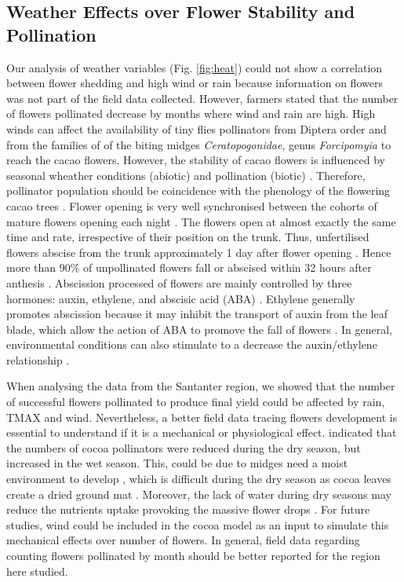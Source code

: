\documentclass[gene,journal,article,submit,moreauthors,pdftex]{Definitions/mdpi}
\begin{document}
\subsection{Weather Effects over Flower Stability and Pollination}

Our analysis of weather variables (Fig. \ref{fig:heat}) could not show a correlation between flower shedding and high wind or rain because information on flowers was not part of the field data collected. However, farmers stated that the number of flowers pollinated decrease by months where wind and rain are high. High winds can affect the availability of tiny flies pollinators from Diptera order and from the families of of the biting midges \textit{Ceratopogonidae},  genus  \textit{Forcipomyia} \citep{Saunders1959, kaufmann1975, sotomayor2020} to reach the cacao flowers. However, the stability of cacao flowers is influenced by seasonal wheather conditions (abiotic) and pollination (biotic) \citep{Frimpong2014}. Therefore, pollinator population should be coincidence with the phenology of the flowering cacao trees \citep{Young1983, Young2012}. Flower opening is very well synchronised between the cohorts of mature flowers opening each night \citep{Niemenak2010}. The flowers open at almost exactly the same time and rate, irrespective of their position on the trunk. Thus, unfertilised flowers abscise from the trunk approximately 1 day after flower opening  \citep{Niemenak2010}. Hence more than 90\% of unpollinated flowers fall or abscised within 32 hours after  anthesis \citep{Aneja1999}. Abscission processed of  flowers are mainly controlled  by  three  hormones: auxin, ethylene, and abscisic acid (ABA) \citep{Aneja1999}. Ethylene generally promotes abscission because it may  inhibit the transport of auxin from the leaf blade, which allow the action of ABA to promove the fall of flowers \citep{Beyer1975}. In general, environmental conditions can also  stimulate   to  a  decrease  the  auxin/ethylene relationship \citep{Aneja1999}.

When analysing the data from the Santanter region, we showed that the number of successful flowers pollinated to produce final yield could be affected by rain, TMAX and wind. Nevertheless, a better field data tracing flowers development is essential to understand if it is a mechanical or physiological effect.  \cite{Frimpong2009, Frimpong2011} indicated that the numbers of cocoa pollinators were reduced during the dry season, but increased in the wet season. This, could be due to midges need a moist environment to develop \citep{Frimpong2014}, which is difficult during the dry season as cocoa leaves create a dried ground mat \citep{Frimpong2009, Frimpong2014}. Moreover, the lack of water during dry seasons may reduce the nutrients uptake provoking the massive flower drops \citep{Vaughton2017}.  For future studies, wind could be included in the cocoa model as an input to simulate this mechanical effects over number of flowers. In general, field data regarding counting flowers pollinated by month should be better reported for the region here studied. 
\end{document}
